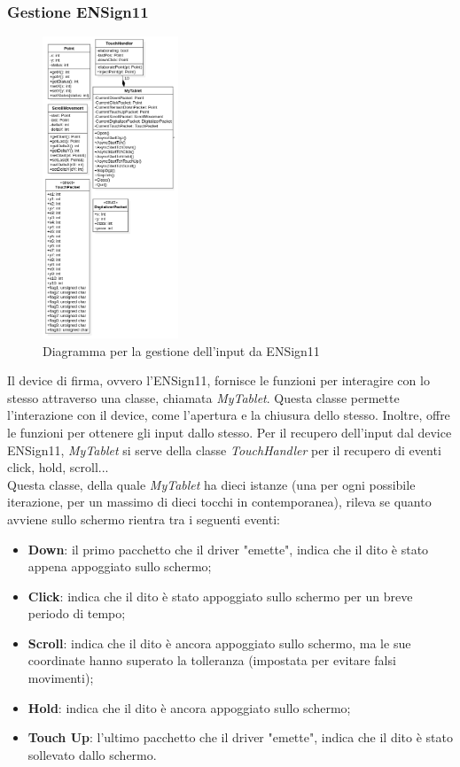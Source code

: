 \subsubsection{Gestione ENSign11}
\begin{figure}[h]
    \centering
    \includegraphics[width=115pt]{images/prog/ENS11.png}
    \caption{Diagramma per la gestione dell'input da ENSign11}
    \label{fig:es11}
\end{figure}
Il device di firma, ovvero l'ENSign11, fornisce le funzioni per interagire con lo stesso attraverso una classe, chiamata \emph{MyTablet}.
Questa classe permette l'interazione con il device, come l'apertura e la chiusura dello stesso. Inoltre, offre le funzioni per ottenere gli input dallo stesso.
Per il recupero dell'input dal device ENSign11, \emph{MyTablet} si serve della classe \emph{TouchHandler} per il recupero di eventi click, hold, scroll...\\
Questa classe, della quale \emph{MyTablet} ha dieci istanze (una per ogni possibile iterazione, per un massimo di dieci tocchi in contemporanea), rileva se quanto avviene sullo schermo rientra tra i seguenti eventi:
\begin{itemize}
    \item \textbf{Down}: il primo pacchetto che il driver "emette", indica che il dito è stato appena appoggiato sullo schermo;
    \item \textbf{Click}: indica che il dito è stato appoggiato sullo schermo per un breve periodo di tempo;
    \item \textbf{Scroll}: indica che il dito è ancora appoggiato sullo schermo, ma le sue coordinate hanno superato la tolleranza (impostata per evitare falsi movimenti);
    \item \textbf{Hold}: indica che il dito è ancora appoggiato sullo schermo;
    \item \textbf{Touch Up}: l'ultimo pacchetto che il driver "emette", indica che il dito è stato sollevato dallo schermo.
\end{itemize}
